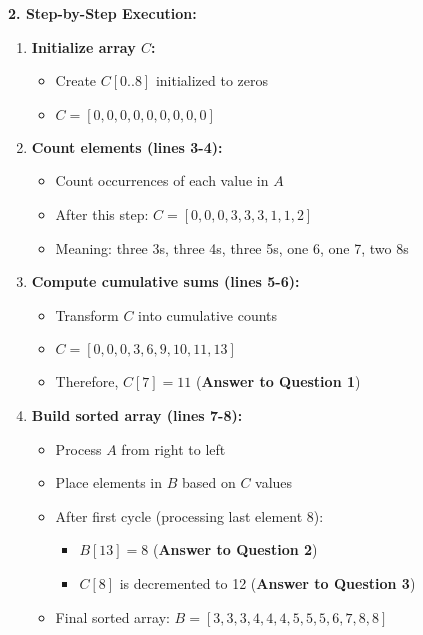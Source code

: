\textbf{2. Step-by-Step Execution:}
\begin{enumerate}[leftmargin=*,noitemsep]
    \item \textbf{Initialize array $C$:}
    \begin{itemize}[noitemsep]
        \item Create $C[0..8]$ initialized to zeros
        \item $C = [0,0,0,0,0,0,0,0,0]$
    \end{itemize}

    \item \textbf{Count elements (lines 3-4):}
    \begin{itemize}[noitemsep]
        \item Count occurrences of each value in $A$
        \item After this step: $C = [0,0,0,3,3,3,1,1,2]$
        \item Meaning: three 3s, three 4s, three 5s, one 6, one 7, two 8s
    \end{itemize}

    \item \textbf{Compute cumulative sums (lines 5-6):}
    \begin{itemize}[noitemsep]
        \item Transform $C$ into cumulative counts
        \item $C = [0,0,0,3,6,9,10,11,13]$
        \item Therefore, $C[7] = 11$ (\textbf{Answer to Question 1})
    \end{itemize}

    \item \textbf{Build sorted array (lines 7-8):}
    \begin{itemize}[noitemsep]
        \item Process $A$ from right to left
        \item Place elements in $B$ based on $C$ values
        \item After first cycle (processing last element 8):
            \begin{itemize}[noitemsep]
                \item $B[13] = 8$ (\textbf{Answer to Question 2})
                \item $C[8]$ is decremented to 12 (\textbf{Answer to Question 3})
            \end{itemize}
        \item Final sorted array: $B = [3,3,3,4,4,4,5,5,5,6,7,8,8]$
    \end{itemize}
\end{enumerate}

